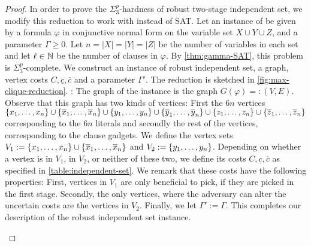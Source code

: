 \begin{proof}
In order to prove the $\Sigma_3^p$-hardness of robust two-stage independent set, we modify this reduction to work with {\radj} instead of SAT. 
Let an instance of {\radj} be given by a formula $\varphi$ in conjunctive normal form on the variable set $X \cup Y \cup Z$, and a parameter $\Gamma \geq 0$. Let $n = |X| = |Y| = |Z|$ be the number of variables in each set and let $\ell \in \mathbb{N}$ be the number of clauses in $\varphi$. 
By \cref{thm:gamma-SAT}, this problem is $\Sigma_3^p$-complete. 
We construct an instance of robust independent set,  a graph, vertex costs $C, \underline{c}, \overline{c}$ and a parameter $\Gamma'$. The reduction is sketched in \cref{fig:max-clique-reduction}. :
The graph of the instance is the graph $G(\varphi) =: (V,E)$. 
Observe that this graph has two kinds of vertices: 
First the $6n$ vertices $\{ x_1, \ldots, x_n \} \cup \{ \overline{x}_1, \ldots, \overline{x}_n \} \cup \{ y_1, \ldots, y_n \} \cup \{ \overline{y}_1, \ldots, \overline{y}_n \} \cup \{ z_1, \ldots, z_n \} \cup \{ \overline{z}_1, \ldots, \overline{z}_n \}$ corresponding to the $6n$ literals and secondly the rest of the vertices, corresponding to the clause gadgets. 
We define the vertex sets $V_1 := \{ x_1, \ldots, x_n \} \cup \{ \overline{x}_1, \ldots, \overline{x}_n \}$ and $V_2 := \{ y_1, \ldots, y_n \}$. 
Depending on whether a vertex is in $V_1$, in $V_2$, or neither of these two, we define its costs $C, \underline{c}, \overline{c}$ as specified in \cref{table:independent-set}. 
We remark that these costs have the following properties: First, vertices in $V_1$ are only beneficial to pick, if they are picked in the first stage. 
Secondly, the only vertices, where the adversary can alter the uncertain costs are the vertices in $V_2$.
Finally, we let $\Gamma' := \Gamma$. This completes our description of the robust independent set instance.
\begin{figure}[htpb]
\centering
{}
\end{figure}
\end{proof}

